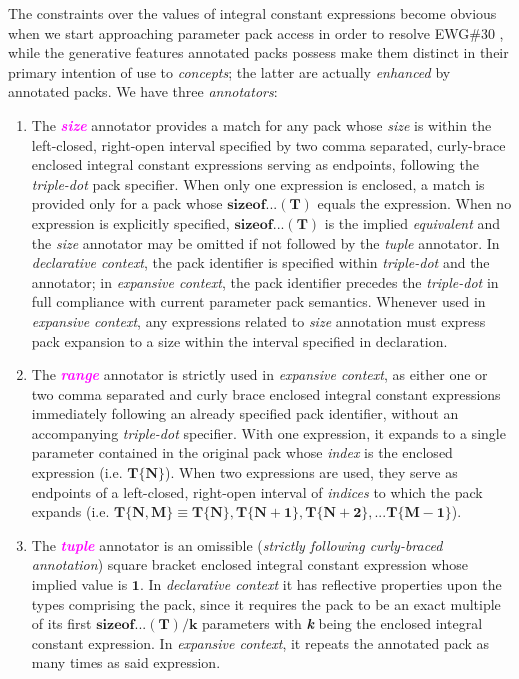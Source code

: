 \p The constraints over the values of integral constant expressions become obvious when we start approaching parameter pack access in order to resolve EWG\#30 \cite{Abrahams2012}, while the generative features annotated packs possess make them distinct in their primary intention of use to \textit{concepts}; the latter are actually \textit{enhanced} by annotated packs.
We have three \textit{annotators}:
\begin{enumerate}
\item\p The \textcolor{Magenta}{\textbf{\textit{size}}} annotator provides a match for any pack whose \textit{size} is within the left-closed, right-open interval specified by two comma separated, curly-brace enclosed integral constant expressions serving as endpoints, following the \textit{triple-dot} pack specifier.
When only one expression is enclosed, a match is provided only for a pack whose $\bm{sizeof...(T)}$ equals the expression.
When no expression is explicitly specified, $\bm{sizeof...(T)}$ is the implied \textit{equivalent} and the \textit{size} annotator may be omitted if not followed by the \textit{tuple} annotator.
In \textit{declarative context}, the pack identifier is specified within \textit{triple-dot} and the annotator; in \textit{expansive context}, the pack identifier precedes the \textit{triple-dot} in full compliance with current parameter pack semantics.
Whenever used in \textit{expansive context}, any expressions related to \textit{size} annotation must express pack expansion to a size within the interval specified in declaration.

\item\p The \textcolor{Magenta}{\textbf{\textit{range}}} annotator is strictly used in \textit{expansive context}, as either one or two comma separated and curly brace enclosed integral constant expressions immediately following an already specified pack identifier, without an accompanying \textit{triple-dot} specifier.
With one expression, it expands to a single parameter contained in the original pack whose \textit{index} is the enclosed expression (i.e. $\bm{T\{N\}}$).
When two expressions are used, they serve as endpoints of a left-closed, right-open interval of \textit{indices} to which the pack expands (i.e. $\bm{T\{N,M\} \equiv T\{N\},T\{N+1\},T\{N+2\},...T\{M-1\}}$).

\item\p The \textcolor{Magenta}{\textbf{\textit{tuple}}} annotator is an omissible (\textit{strictly following curly-braced annotation}) square bracket enclosed integral constant expression whose implied value is $\bm{1}$.
In \textit{declarative context} it has reflective properties upon the types comprising the pack, since it requires the pack to be an exact multiple of its first $\bm{sizeof...(T)/k}$ parameters  with \textbf{\textit{k}} being the enclosed integral constant expression.
In \textit{expansive context}, it repeats the annotated pack as many times as said expression.

\end{enumerate}

